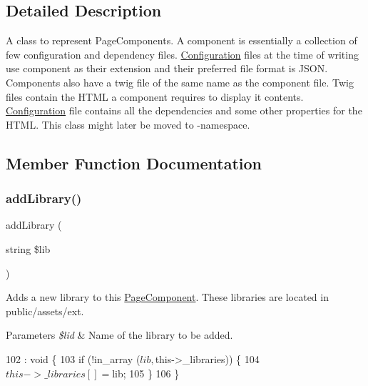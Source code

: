 \subsection{Detailed Description}
A class to represent Page\+Components. A component is essentially a collection of few configuration and dependency files. \hyperlink{class_lora_1_1_configuration}{Configuration} files at the time of writing use component as their extension and their preferred file format is J\+S\+ON. Components also have a twig file of the same name as the component file. Twig files contain the H\+T\+ML a component requires to display it contents. \hyperlink{class_lora_1_1_configuration}{Configuration} file contains all the dependencies and some other properties for the H\+T\+ML. This class might later be moved to  -\/namespace. 

\subsection{Member Function Documentation}
\mbox{\label{class_lora_1_1_page_component_acd0b83bc65713449f479130693bf4dbc}} 
\subsubsection{\texorpdfstring{add\+Library()}{addLibrary()}}
{\footnotesize\ttfamily add\+Library (\begin{DoxyParamCaption}\item[{string}]{\$lib }\end{DoxyParamCaption})}

Adds a new library to this \hyperlink{class_lora_1_1_page_component}{Page\+Component}. These libraries are located in public/assets/ext. 
\begin{DoxyParams}{Parameters}
{\em \$lid} & Name of the library to be added. \\
\hline
\end{DoxyParams}

\begin{DoxyCode}
102                                              : \textcolor{keywordtype}{void} \{
103         \textcolor{keywordflow}{if} (!in\_array ($lib, $this->\_libraries)) \{
104             $this->\_libraries [] = $lib;
105         \}
106     \}
\end{DoxyCode}
\mbox{\label{class_lora_1_1_page_component_aa1c1a80393db2b30ad535b13de050778}} 
